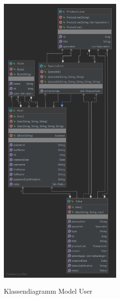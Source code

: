 \begin{figure}[htb]
    \centering
    \begin{minipage}[H]{1\textwidth}
        \caption{Klassendiagramm Model User}
        \includegraphics[width=0.55\textwidth]{img/user-model-klassendiagramm.png}\\
        \label{fig:user-model-klassendiagramm}
    \end{minipage}
\end{figure}
